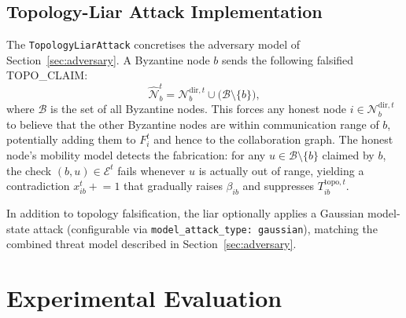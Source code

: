 \documentclass[journal]{IEEEtran}
\newenvironment{added}{\begingroup\color{addedcolor}}{\endgroup}
\theoremstyle{definition}
\theoremstyle{remark}
\begin{document}
\subsection{Topology-Liar Attack Implementation}

\begin{added}
The \texttt{TopologyLiarAttack} concretises the adversary model of Section~\ref{sec:adversary}.
A Byzantine node $b$ sends the following falsified TOPO\_CLAIM:
\begin{equation}
  \widehat{\mathcal{N}}_b^t = \mathcal{N}_b^{\mathrm{dir},t} \cup \bigl(\mathcal{B} \setminus \{b\}\bigr),
  \label{eq:liar_claim}
\end{equation}
where $\mathcal{B}$ is the set of all Byzantine nodes.
This forces any honest node $i \in \mathcal{N}_b^{\mathrm{dir},t}$ to believe that the other Byzantine nodes are within communication range of $b$, potentially adding them to $F_i^t$ and hence to the collaboration graph.
The honest node's mobility model detects the fabrication: for any $u \in \mathcal{B} \setminus \{b\}$ claimed by $b$, the check $(b,u) \in \mathcal{E}^t$ fails whenever $u$ is actually out of range, yielding a contradiction $x_{ib}^t \mathrel{+}= 1$ that gradually raises $\beta_{ib}$ and suppresses $T_{ib}^{\mathrm{topo},t}$.

In addition to topology falsification, the liar optionally applies a Gaussian model-state attack (configurable via \texttt{model\_attack\_type: gaussian}), matching the combined threat model described in Section~\ref{sec:adversary}.
\end{added}

\section{Experimental Evaluation}
\label{sec:experiments}
\end{document}
